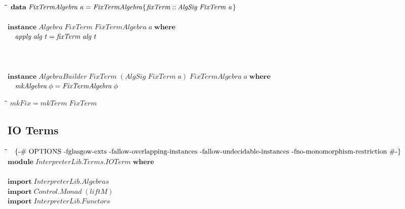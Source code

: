 \documentclass[10pt]{article}
\newlength{\lwidth}\setlength{\lwidth}{4.5cm}
\newlength{\cwidth}\setlength{\cwidth}{8mm} %
\newcommand{\Conid}[1]{\mathit{#1}}
\newcommand{\Varid}[1]{\mathit{#1}}
\begin{document}
\begin{tabbing}
\qquad\=\hspace{\lwidth}\=\hspace{\cwidth}\=\+\kill
${\mathbf{data}\;\Conid{FixTermAlgebra}\;\Varid{a}\mathrel{=}\Conid{FixTermAlgebra}\{\mskip1.5mu \Varid{fixTerm}\mathbin{::}\Conid{AlgSig}\;\Conid{FixTerm}\;\Varid{a}\mskip1.5mu\}}$\\
${}$\\
${\mathbf{instance}\;\Conid{Algebra}\;\Conid{FixTerm}\;\Conid{FixTermAlgebra}\;\Varid{a}\;\mathbf{where}}$\\
${\hskip1.00em\relax\Varid{apply}\;\Varid{alg}\;\Varid{t}\mathrel{=}\Varid{fixTerm}\;\Varid{alg}\;\Varid{t}}$\\
${}$\\
${}$\\
${}$\\
${\mathbf{instance}\;\Conid{AlgebraBuilder}\;\Conid{FixTerm}\;(\Conid{AlgSig}\;\Conid{FixTerm}\;\Varid{a})\;\Conid{FixTermAlgebra}\;\Varid{a}\;\mathbf{where}}$\\
${\hskip1.00em\relax\Varid{mkAlgebra}\;\Varid{\phi}\mathrel{=}\Conid{FixTermAlgebra}\;\Varid{\phi}}$
\end{tabbing}

\begin{tabbing}
\qquad\=\hspace{\lwidth}\=\hspace{\cwidth}\=\+\kill
${\Varid{mkFix}\mathrel{=}\Varid{mkTerm}\;\Conid{FixTerm}}$
\end{tabbing}
\subsection{IO Terms}
\begin{tabbing}
\qquad\=\hspace{\lwidth}\=\hspace{\cwidth}\=\+\kill
${\mbox{\enskip\{-\# OPTIONS -fglasgow-exts -fallow-overlapping-instances -fallow-undecidable-instances -fno-monomorphism-restriction  \#-\}\enskip}}$\\
${\mathbf{module}\;\Conid{\Conid{InterpreterLib}.\Conid{Terms}.IOTerm}\;\mathbf{where}}$\\
${}$\\
${\mathbf{import}\;\Conid{\Conid{InterpreterLib}.Algebras}}$\\
${\mathbf{import}\;\Conid{\Conid{Control}.Monad}\;(\Varid{liftM})}$\\
${\mathbf{import}\;\Conid{\Conid{InterpreterLib}.Functors}}$
\end{tabbing}
\end{document}
